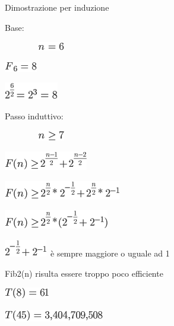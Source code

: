 \documentclass{article}
\begin{document}
{Dimostrazione per induzione}

{Base:}

{~~~~~~~~}\includegraphics{images/image58.png}

\includegraphics{images/image59.png}

\includegraphics{images/image60.png}

{Passo induttivo:}

{~~~~~~~~}\includegraphics{images/image61.png}

{}

\includegraphics{images/image62.png}

\includegraphics{images/image63.png}

\includegraphics{images/image64.png}

{}

\includegraphics{images/image65.png}{~è sempre maggiore o uguale ad 1}

{}

{Fib2(n) risulta essere troppo poco efficiente}

\includegraphics{images/image66.png}

\includegraphics{images/image67.png}

{}
\end{document}
